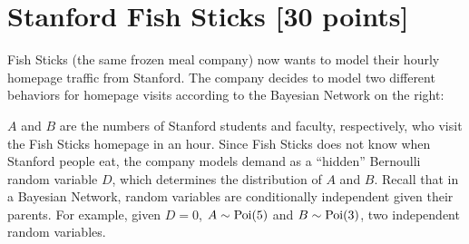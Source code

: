 
\newpage
\section{Stanford Fish Sticks [30 points]}
\begin{minipage}{0.41\textwidth}
Fish Sticks (the same frozen meal company) now wants to model their hourly homepage traffic from Stanford. The company decides to model two different behaviors for homepage visits according to the Bayesian Network on the right:
\end{minipage}
%
\begin{minipage}{0.58\textwidth}
\begin{center}
\end{center}
\end{minipage}

$A$ and $B$ are the numbers of Stanford students and faculty, respectively, who visit the Fish Sticks homepage in an hour. Since Fish Sticks does not know when Stanford people eat, the company models demand as a ``hidden'' Bernoulli random variable $D$, which determines the distribution of $A$ and $B$. Recall that in a Bayesian Network, random variables are conditionally independent given their parents.  For example, given $D = 0$, $A\sim\operatorname{Poi}(5{})$ and $B\sim\operatorname{Poi}(3{})$, two independent random variables.

